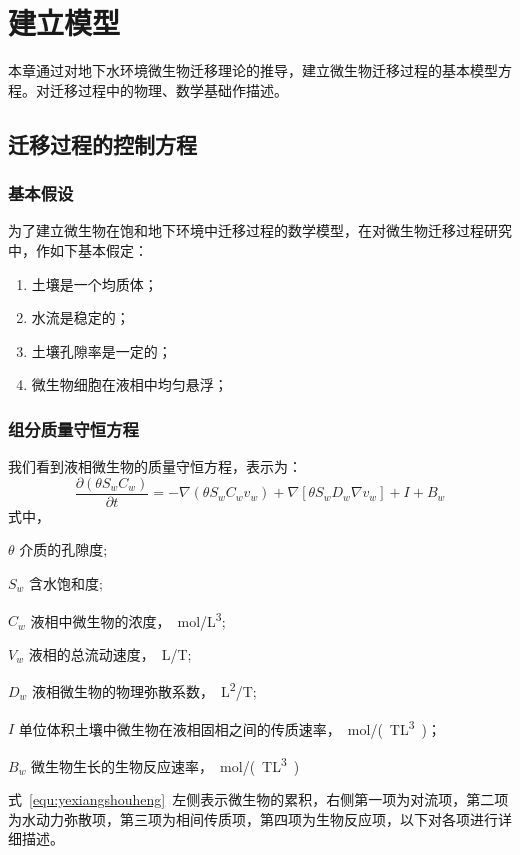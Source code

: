 \chapter{建立模型}
本章通过对地下水环境微生物迁移理论的推导，建立微生物迁移过程的基本模型方程。对迁移过程中的物理、数学基础作描述。
\section{迁移过程的控制方程}
\subsection{基本假设}
为了建立微生物在饱和地下环境中迁移过程的数学模型，在对微生物迁移过程研究中，作如下基本假定：
\begin{enumerate}\setlength{\itemsep}{0em}
\item 土壤是一个均质体； 
\item 水流是稳定的； 
\item 土壤孔隙率是一定的； 
\item 微生物细胞在液相中均匀悬浮； 
\end{enumerate}\par
\subsection{组分质量守恒方程}
我们看到液相微生物的质量守恒方程，表示为：
\begin{equation}\label{equ:yexiangshouheng}
\dfrac{\partial(\theta S_w C_w)}{\partial t}
=-\nabla(\theta S_w C_w v_w)+\nabla[\theta S_wD_w\nabla v_w]+I+B_w
\end{equation}
式中，
\begin{paralist}
	\item[$\theta$]介质的孔隙度;
	\item[$S_w$]含水饱和度;
	\item[$C_w$]液相中微生物的浓度，\SI{}{mol/L^3};
	\item[$V_w$]液相的总流动速度，\SI{}{L/T};
	\item[$D_w$]液相微生物的物理弥散系数，\SI{}{L^2/T};
	\item[$I$]单位体积土壤中微生物在液相固相之间的传质速率，\SI{}{mol/(TL^3)}；
	\item[$B_w$]微生物生长的生物反应速率，\SI{}{mol/(TL^3)}
\end{paralist}
式~\ref{equ:yexiangshouheng}~左侧表示微生物的累积，右侧第一项为对流项，第二项为水动力弥散项，第三项为相间传质项，第四项为生物反应项，以下对各项进行详细描述。
